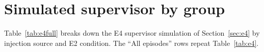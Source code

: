 \section{Simulated supervisor by group}
\label{app:e4}

Table~\ref{tab:e4full} breaks down the E4 supervisor simulation of Section~\ref{sec:e4} by injection
source and E2 condition. The ``All episodes'' rows repeat Table~\ref{tab:e4}.

\begin{table}[!ht]
  \centering
  \caption{E4, simulated supervisor on E1 and E2, by group. Columns and policies as in
  Table~\ref{tab:e4}. \emph{No sub-task} is the $k=0$ baseline; each source row pools $k=1,2,4$ (108
  episodes); E2 rows are the five \texttt{qwen3-coder} conditions under the \textsf{mix} load. The
  supervisor is assumed to apply the panel labels exactly, so the figures are upper bounds.}
  \label{tab:e4full}
  \small
  \fittable{}
\end{table}
